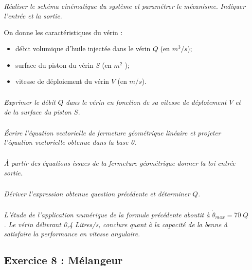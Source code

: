 \documentclass[10pt,fleqn]{article} %
\begin{document}
\begin{multicols}{2}
\subparagraph{}
\textit{Réaliser le schéma cinématique du système et paramétrer le mécanisme. Indiquer l'entrée et la sortie.}
\ifprof
\begin{corrige}
\end{corrige}
\else
\fi

On donne les caractéristiques du vérin : 
\begin{itemize}
\item débit volumique d'huile injectée dans le vérin $Q$ (en $m^3/s$);
\item surface du piston du vérin $S$ (en $m^2$ );
\item vitesse de déploiement du vérin $V$ (en $m/s$). 
\end{itemize}

\subparagraph{}
\textit{Exprimer le débit $Q$ dans le vérin en fonction de sa vitesse de déploiement $V$ et de la surface du piston $S$.}
\ifprof
\begin{corrige}
\end{corrige}
\else
\fi

\subparagraph{}
\textit{Écrire l'équation vectorielle de fermeture géométrique linéaire et projeter l’équation vectorielle obtenue dans la base 0. }
\ifprof
\begin{corrige}
\end{corrige}
\else
\fi

\subparagraph{}
\textit{À partir des équations issues de la fermeture géométrique donner la loi entrée sortie. }
\ifprof
\begin{corrige}
\end{corrige}
\else
\fi

\subparagraph{}
\textit{ Dériver l'expression obtenue question précédente et déterminer $Q$. }
\ifprof
\begin{corrige}
\end{corrige}
\else
\fi

\subparagraph{}
\textit{ L'étude de l'application numérique de la formule précédente aboutit à $\dot{\theta}_{max} = 70 \; Q$. Le vérin délivrant 0,4 Litres/s, conclure quant à la capacité de la benne à satisfaire la performance en vitesse angulaire. }
\ifprof
\begin{corrige}
\end{corrige}
\else
\fi

\newpage

\subsection*{Exercice 8 : Mélangeur}
\setcounter{exo}{0}

\end{multicols}
\end{document}
